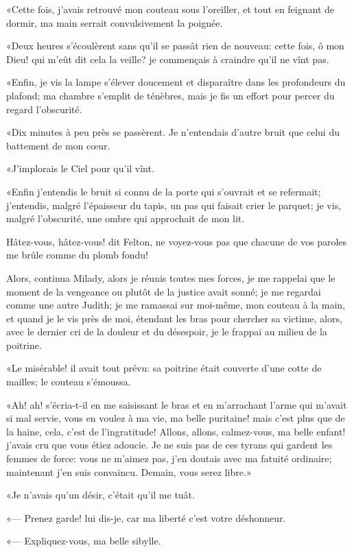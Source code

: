 «Cette fois, j'avais retrouvé mon couteau sous l'oreiller, et tout en feignant de dormir, ma main serrait convulsivement la poignée. 

«Deux heures s'écoulèrent sans qu'il se passât rien de nouveau: cette fois, ô mon Dieu! qui m'eût dit cela la veille? je commençais à craindre qu'il ne vînt pas. 

«Enfin, je vis la lampe s'élever doucement et disparaître dans les profondeurs du plafond; ma chambre s'emplit de ténèbres, mais je fis un effort pour percer du regard l'obscurité. 

«Dix minutes à peu près se passèrent. Je n'entendais d'autre bruit que celui du battement de mon cœur. 

«J'implorais le Ciel pour qu'il vînt. 

«Enfin j'entendis le bruit si connu de la porte qui s'ouvrait et se refermait; j'entendis, malgré l'épaisseur du tapis, un pas qui faisait crier le parquet; je vis, malgré l'obscurité, une ombre qui approchait de mon lit. 

\speak  Hâtez-vous, hâtez-vous! dit Felton, ne voyez-vous pas que chacune de vos paroles me brûle comme du plomb fondu! 

\speak  Alors, continua Milady, alors je réunis toutes mes forces, je me rappelai que le moment de la vengeance ou plutôt de la justice avait sonné; je me regardai comme une autre Judith; je me ramassai sur moi-même, mon couteau à la main, et quand je le vis près de moi, étendant les bras pour chercher sa victime, alors, avec le dernier cri de la douleur et du désespoir, je le frappai au milieu de la poitrine. 

«Le misérable! il avait tout prévu: sa poitrine était couverte d'une cotte de mailles; le couteau s'émoussa. 

«Ah! ah! s'écria-t-il en me saisissant le bras et en m'arrachant l'arme qui m'avait si mal servie, vous en voulez à ma vie, ma belle puritaine! mais c'est plus que de la haine, cela, c'est de l'ingratitude! Allons, allons, calmez-vous, ma belle enfant! j'avais cru que vous étiez adoucie. Je ne suis pas de ces tyrans qui gardent les femmes de force: vous ne m'aimez pas, j'en doutais avec ma fatuité ordinaire; maintenant j'en suis convaincu. Demain, vous serez libre.» 

«Je n'avais qu'un désir, c'était qu'il me tuât. 

«--- Prenez garde! lui dis-je, car ma liberté c'est votre déshonneur. 

«--- Expliquez-vous, ma belle sibylle. 

